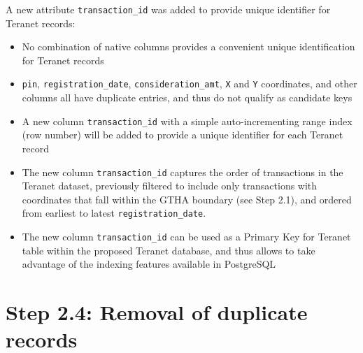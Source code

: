 \documentclass[11pt]{article}
\begin{document}
    \vspace{5mm}

    A new attribute \texttt{transaction\_id} was added to provide unique identifier for Teranet records:
    \begin{itemize}
        \item No combination of native columns provides a convenient unique identification for Teranet records
        \item \texttt{pin}, \texttt{registration\_date}, \texttt{consideration\_amt}, \texttt{X} and \texttt{Y} coordinates, and other columns all have duplicate entries, and thus do not qualify as candidate keys
        \item A new column \texttt{transaction\_id} with a simple auto-incrementing range index (row number) will be added to provide a unique identifier for each Teranet record
        \item The new column \texttt{transaction\_id} captures the order of transactions in the Teranet dataset, previously filtered to include only transactions with coordinates that fall within the GTHA boundary (see Step 2.1), and ordered from earliest to latest \texttt{registration\_date}.
        \item The new column \texttt{transaction\_id} can be used as a Primary Key for Teranet table within the proposed Teranet database, and thus allows to take advantage of the indexing features available in PostgreSQL
    \end{itemize}

    \section{Step 2.4: Removal of duplicate records} \label{sec:teranet_drop_duplicates}

    \medskip

    
    
\end{document}
